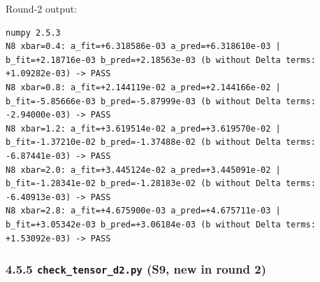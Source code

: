 \documentclass[11pt,a4paper]{article}
\begin{document}
Round-2 output:

\begin{lstlisting}
numpy 2.5.3
N8 xbar=0.4: a_fit=+6.318586e-03 a_pred=+6.318610e-03 | b_fit=+2.18716e-03 b_pred=+2.18563e-03 (b without Delta terms: +1.09282e-03) -> PASS
N8 xbar=0.8: a_fit=+2.144119e-02 a_pred=+2.144166e-02 | b_fit=-5.85666e-03 b_pred=-5.87999e-03 (b without Delta terms: -2.94000e-03) -> PASS
N8 xbar=1.2: a_fit=+3.619514e-02 a_pred=+3.619570e-02 | b_fit=-1.37210e-02 b_pred=-1.37488e-02 (b without Delta terms: -6.87441e-03) -> PASS
N8 xbar=2.0: a_fit=+3.445124e-02 a_pred=+3.445091e-02 | b_fit=-1.28341e-02 b_pred=-1.28183e-02 (b without Delta terms: -6.40913e-03) -> PASS
N8 xbar=2.8: a_fit=+4.675900e-03 a_pred=+4.675711e-03 | b_fit=+3.05342e-03 b_pred=+3.06184e-03 (b without Delta terms: +1.53092e-03) -> PASS
\end{lstlisting}

\hypertarget{check_tensor_d2.py-s9-new-in-round-2}{%
\subsubsection{\texorpdfstring{4.5.5 \texttt{check\_tensor\_d2.py} (S9, new in round 2)}{4.5.5  (S9, new in round 2)}}\label{check_tensor_d2.py-s9-new-in-round-2}}
\end{document}
